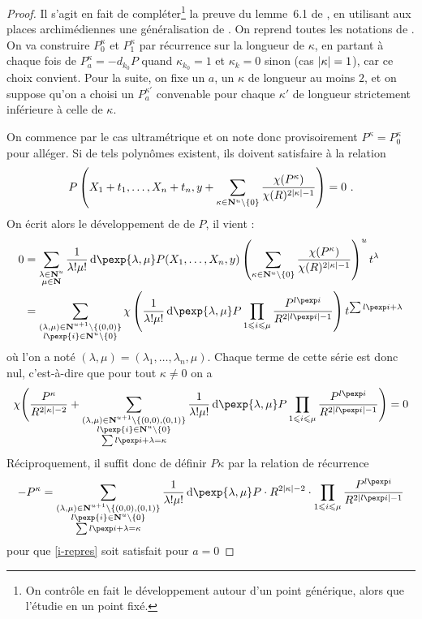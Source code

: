 \documentclass{mpg-preth}
\begin{document}
\begin{proof}
  Il s'agit en fait de compléter\footnote{On contrôle en fait le développement
    autour d'un point générique, alors que  l'étudie en un point
    fixé.} la preuve du lemme~6.1 de \cite{remivds}, en
  utilisant aux places archimédiennes une généralisation de
  \cite[relation~2.3.1, p.~63]{farhith}. On reprend toutes les notations de
  \cite{remivds}. On va construire $P_0^\kappa$ et $P_1^\kappa$ par récurrence
  sur la longueur de $\kappa$, en partant à chaque fois de $P_a^\kappa = -
  d_{k_0}P$ quand $\kappa_{k_0} = 1$ et $\kappa_k = 0$ sinon (cas $\lvert\kappa\rvert
  = 1$), car ce choix convient. Pour la suite, on fixe un $a$, un $\kappa$ de
  longueur au moins $2$, et on suppose qu'on a choisi un $P_a^{\kappa'}$
  convenable pour chaque $\kappa'$ de longueur strictement inférieure à celle
  de $\kappa$.

  On commence par le cas ultramétrique et on note donc provisoirement $P^\kappa
  = P_0^\kappa$ pour alléger. Si de tels polynômes existent, ils doivent
  satisfaire à la relation
  \[
    P\left( X_1+t_1, \ldots, X_n+t_n, y + \sum_{\kappa \in {\mathbf{N}}^u\setminus\{0\}}
    \frac{\chi(P^\kappa)}{\chi(R)^{2\lvert\kappa\rvert -1}}\right) = 0 \text{ .}
  \]
  On écrit alors le développement de  de $P$, il vient :
  \begin{align*}
    0
    & = \sum_{\substack{\lambda\in\N^u \\ \mu \in \N}} \frac1{\lambda!\mu!}\,
      \diff\pexp{\lambda, \mu}P(X_1,\ldots, X_n,y) \left(\sum_{\kappa \in
      \N^u\setminus\{0\}} \frac{\chi(P^\kappa)}{\chi(R)^{2\lgr\kappa -1}}
      \right)^u t^\lambda \\
    & = \sum_{\substack{(\lambda,\mu)\in\N^{u+1}\setminus\{(0,0)\}\\
      l\pexp{i} \in \N^u\setminus\{0\}}} \chi\left( \frac1{\lambda!\mu!}\,
      \diff\pexp{\lambda,\mu}P \prod_{1\le i \le \mu}
      \frac{P^{l\pexp i}}{R^{2\lgr{l\pexp i} -1}} \right)
      t^{\sum l\pexp i + \lambda}
  \end{align*}
  où l'on a noté $(\lambda, \mu) = (\lambda_1, \ldots, \lambda_n, \mu)$. Chaque
  terme de cette série est donc nul, c'est-à-dire que pour tout $\kappa \neq 0$
  on a
  \[
    \chi \Biggl( \frac{P^\kappa}{R^{2\lgr\kappa - 2}} +
    \sum_{\substack{(\lambda,\mu)\in\N^{u+1}\setminus\{(0,0), (0,1)\}\\
    l\pexp{i} \in \N^u\setminus\{0\} \\ \sum l\pexp i + \lambda = \kappa}}
    \frac1{\lambda!\mu!}\,\diff\pexp{\lambda,\mu}P \prod_{1\le i \le \mu}
    \frac{P^{l\pexp i}}{R^{2\lgr{l\pexp i} -1}} \Biggr) = 0
  \]
  Réciproquement, il suffit donc de définir $P\kappa$ par la relation de
  récurrence
  \[ - P^\kappa =
    \sum_{\substack{(\lambda,\mu)\in\N^{u+1}\setminus\{(0,0), (0,1)\}\\
    l\pexp{i} \in \N^u\setminus\{0\} \\ \sum l\pexp i + \lambda = \kappa}}
    \frac1{\lambda!\mu!}\,\diff\pexp{\lambda,\mu}P
    \cdot R^{2\lgr\kappa - 2}
    \cdot \prod_{1\le i \le \mu} \frac{P^{l\pexp i}}{R^{2\lgr{l\pexp i} -1}}
  \]
  pour que \ref{i-repres} soit satisfait pour $a=0$


\end{proof}
\end{document}
